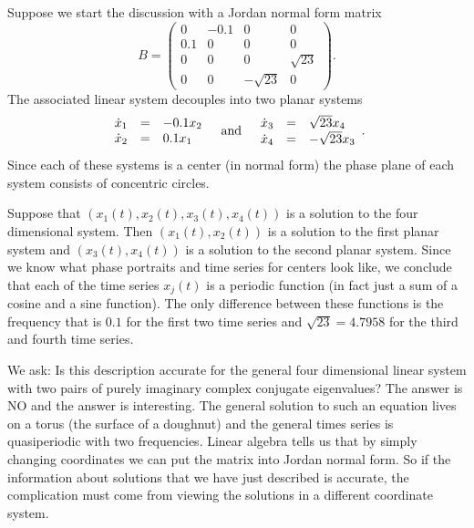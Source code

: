 \documentclass{ximera}
\begin{document}
Suppose we start the discussion with a Jordan normal form 
matrix 
\[
B = \left(\begin{array}{rrrr}
  0  &  -0.1  &  0   &  0       \\
0.1  &    0   &  0   &  0       \\
  0  &    0   &  0   & \sqrt{23}\\
  0  &    0   & -\sqrt{23} & 0
\end{array}\right).
\]
The associated linear system decouples into two planar systems
\[
\begin{array}{rcl}
\dot{x}_1 & = & -0.1x_2 \\
\dot{x}_2 & = &  0.1x_1 \\
\end{array}
\quad\mbox{and}\quad
\begin{array}{rcl}
\dot{x}_3 & = &  \sqrt{23}x_4 \\
\dot{x}_4 & = & -\sqrt{23}x_3 \\
\end{array}.
\]
Since each of these systems is a center (in normal form) the phase 
plane of each system consists of concentric circles.  

Suppose that $(x_1(t),x_2(t),x_3(t),x_4(t))$ is a solution to the 
four dimensional system.  Then $(x_1(t),x_2(t))$ is a solution to the 
first planar system and $(x_3(t),x_4(t))$ is a solution to the second 
planar system.  Since we know what phase portraits
 and time series for
centers look like, we conclude that each of the time series $x_j(t)$ is
a periodic function (in fact just a sum of a cosine and a sine function).  
The only difference between these functions is the frequency that is 
$0.1$ for the first two time series and $\sqrt{23}=4.7958$ for the third 
and fourth time series.

We ask:  Is this description accurate for the general four dimensional linear 
system with two pairs of purely imaginary complex conjugate eigenvalues?  The 
answer is NO and the answer is interesting.  The general solution
 to such an equation lives on a torus 
(the surface of a doughnut) and the general times series is quasiperiodic
with two frequencies.  Linear algebra 
tells us that by simply changing coordinates we can put the matrix into 
Jordan normal form.  So if the information about 
solutions that we have just described is accurate, the complication must come 
from viewing the solutions in a different coordinate system.
\end{document}

